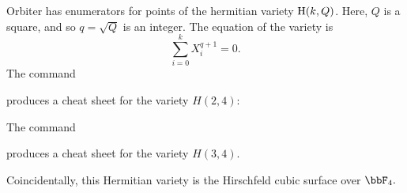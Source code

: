 Orbiter has enumerators for points of the hermitian variety ${\rm H}(k,Q)$.
Here, $Q$ is a square, and so $q = \sqrt{Q}$ is an integer. 
The equation of the variety is 
$$
\sum_{i=0}^k X_i^{q+1} = 0.
$$
The command 


produces a cheat sheet for the variety $H(2,4)$:\\

\bigskip

The command 


produces a cheat sheet for the variety $H(3,4)$.


\bigskip



\bigskip

Coincidentally, this Hermitian variety 
is the Hirschfeld cubic surface over $\bbF_4.$
